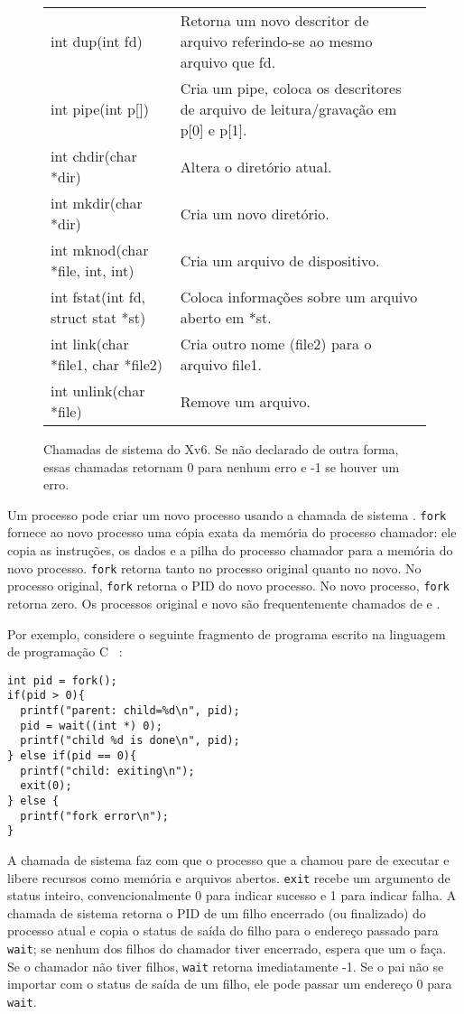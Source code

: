 \begin{figure}[H]
\begin{tabular}{p{4cm} p{10cm}}
int dup(int fd) & Retorna um novo descritor de arquivo referindo-se ao mesmo arquivo que fd. \\
int pipe(int p[]) & Cria um pipe, coloca os descritores de arquivo de leitura/gravação em p[0] e p[1]. \\
int chdir(char *dir) & Altera o diretório atual. \\
int mkdir(char *dir) & Cria um novo diretório. \\
int mknod(char *file, int, int) & Cria um arquivo de dispositivo. \\
int fstat(int fd, struct stat *st) & Coloca informações sobre um arquivo aberto em *st. \\
int link(char *file1, char *file2) & Cria outro nome (file2) para o arquivo file1. \\
int unlink(char *file) & Remove um arquivo. \\
\end{tabular}
\normalsize
\caption{Chamadas de sistema do Xv6. Se não declarado de outra forma, essas chamadas retornam
0 para nenhum erro e -1 se houver um erro.}
\label{fig:api}
\end{figure}

Um processo pode criar um novo processo usando a
chamada de sistema .
\lstinline{fork}
fornece ao novo processo uma cópia exata da memória do processo
chamador: ele copia as instruções, os dados e
a pilha do processo chamador para a memória do novo processo.
\lstinline{fork}
retorna tanto no processo original quanto no novo.
No processo original, \lstinline{fork} retorna o PID do novo processo.
No novo processo, \lstinline{fork} retorna zero.
Os processos original e novo são frequentemente chamados de
e
.

Por exemplo, considere o seguinte fragmento de programa escrito na linguagem de programação C
~\cite{kernighan}:
\begin{lstlisting}[]
int pid = fork();
if(pid > 0){
  printf("parent: child=%d\n", pid);
  pid = wait((int *) 0);
  printf("child %d is done\n", pid);
} else if(pid == 0){
  printf("child: exiting\n");
  exit(0);
} else {
  printf("fork error\n");
}
\end{lstlisting}
A
chamada de sistema 
faz com que o processo que a chamou pare de executar e
libere recursos como memória e arquivos abertos.
\lstinline{exit} recebe um argumento de status inteiro,
convencionalmente 0 para indicar sucesso e 1 para indicar falha.
A
chamada de sistema 
retorna o PID de um filho encerrado (ou finalizado) do
processo atual e copia o status de saída do filho para o endereço
passado para \lstinline{wait}; se nenhum dos filhos do chamador
tiver encerrado,
espera que um o faça.
Se o chamador não tiver filhos, \lstinline{wait} retorna imediatamente -1.
Se o pai não se importar com o status de saída de um filho, ele pode
passar um endereço 0 para
\lstinline{wait}.

